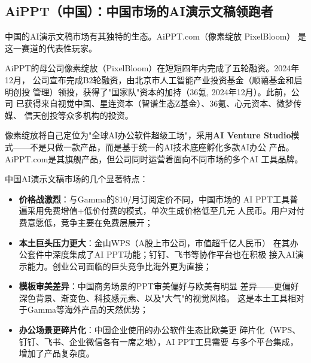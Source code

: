 \subsection{AiPPT（中国）：中国市场的AI演示文稿领跑者}
\label{subsec:aippt}

中国的AI演示文稿市场有其独特的生态。AiPPT.com（像素绽放 PixelBloom）
是这一赛道的代表性玩家。

AiPPT的母公司像素绽放（PixelBloom）在短短四年内完成了五轮融资。2024年12月，
公司宣布完成B2轮融资，由北京市人工智能产业投资基金（顺禧基金和启明创投
管理）领投，获得了"国家队"资本的加持（36氪, 2024年12月）。此前，公司
已获得来自视觉中国、星连资本（智谱生态Z基金）、36氪、心元资本、微梦传媒、
信天创投等众多机构的投资。

像素绽放将自己定位为"全球AI办公软件超级工场"，采用\textbf{AI Venture
Studio}模式——不是只做一款产品，而是基于统一的AI技术底座孵化多款AI办公
产品。AiPPT.com是其旗舰产品，但公司同时运营着面向不同市场的多个AI
工具品牌。

中国AI演示文稿市场的几个显著特点：

\begin{itemize}
  \item \textbf{价格战激烈}：与Gamma的\$10/月订阅定价不同，中国市场的
    AI PPT工具普遍采用免费增值+低价付费的模式，单次生成价格低至几元
    人民币。用户对付费意愿低，竞争主要在免费层展开；
  \item \textbf{本土巨头压力更大}：金山WPS（A股上市公司，市值超千亿人民币）
    在其办公套件中深度集成了AI PPT功能；钉钉、飞书等协作平台也在积极
    接入AI演示能力。创业公司面临的巨头竞争比海外更为直接；
  \item \textbf{模板审美差异}：中国商务场景的PPT审美偏好与欧美有明显
    差异——更偏好深色背景、渐变色、科技感元素、以及"大气"的视觉风格。
    这是本土工具相对于Gamma等海外产品的天然优势；
  \item \textbf{办公场景更碎片化}：中国企业使用的办公软件生态比欧美更
    碎片化（WPS、钉钉、飞书、企业微信各有一席之地），AI PPT工具需要
    与多个平台集成，增加了产品复杂度。
\end{itemize}

